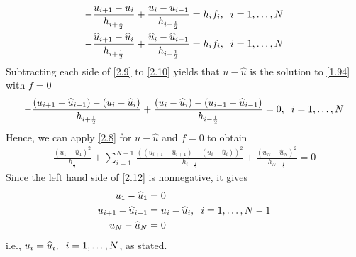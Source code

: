 \documentclass[a4paper]{article}
\numberwithin{equation}{section}
\begin{document}
\begin{align}
\label{2.9}
 - \frac{{{u_{i + 1}} - {u_i}}}{{{h_{i + \frac{1}{2}}}}} + \frac{{{u_i} - {u_{i - 1}}}}{{{h_{i - \frac{1}{2}}}}} &= {h_i}{f_i},\hspace{0.2cm}i = 1, \ldots ,N\\
 - \frac{{{{\widehat u}_{i + 1}} - {{\widehat u}_i}}}{{{h_{i + \frac{1}{2}}}}} + \frac{{{{\widehat u}_i} - {{\widehat u}_{i - 1}}}}{{{h_{i - \frac{1}{2}}}}} &= {h_i}{f_i},\hspace{0.2cm}i = 1, \ldots ,N \label{2.10}
\end{align}
Subtracting each side of \eqref{2.9} to \eqref{2.10} yields that $u-\widehat{u}$ is the solution to \eqref{1.94} with $f=0$
\begin{align}
 - \frac{{\left( {{u_{i + 1}} - {{\widehat u}_{i + 1}}} \right) - \left( {{u_i} - {{\widehat u}_i}} \right)}}{{{h_{i + \frac{1}{2}}}}} + \frac{{\left( {{u_i} - {{\widehat u}_i}} \right) - \left( {{u_{i - 1}} - {{\widehat u}_{i - 1}}} \right)}}{{{h_{i - \frac{1}{2}}}}} = 0,\hspace{0.2cm}i = 1, \ldots ,N
\end{align}
Hence, we can apply \eqref{2.8} for $u-\widehat{u}$ and $f=0$ to obtain
\begin{align}
\label{2.12}
\frac{{{{\left( {{u_1} - {{\widehat u}_1}} \right)}^2}}}{{{h_{\frac{1}{2}}}}} + \sum\limits_{i = 1}^{N - 1} {\frac{{{{\left( {\left( {{u_{i + 1}} - {{\widehat u}_{i + 1}}} \right) - \left( {{u_i} - {{\widehat u}_i}} \right)} \right)}^2}}}{{{h_{i + \frac{1}{2}}}}}}  + \frac{{{{\left( {{u_N} - {{\widehat u}_N}} \right)}^2}}}{{{h_{N + \frac{1}{2}}}}} = 0
\end{align}
Since the left hand side of \eqref{2.12} is nonnegative, it gives
\begin{align}
{u_1} - {\widehat u_1} &= 0\\
{u_{i + 1}} - {\widehat u_{i + 1}} &= {u_i} - {\widehat u_i},\hspace{0.2cm}i = 1, \ldots ,N - 1\\
{u_N} - {\widehat u_N} &= 0
\end{align}
i.e., ${u_i} = {\widehat u_i},\hspace{0.2cm}i = 1, \ldots ,N$, as stated.
\end{document}
